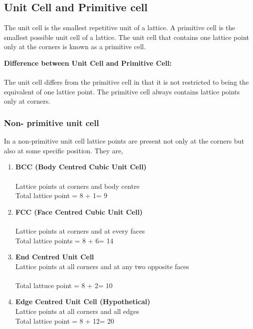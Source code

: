 \subsection{ Unit Cell and Primitive cell}
The unit cell is the smallest repetitive unit of a lattice. A primitive cell is the smallest possible unit cell of a lattice. The unit cell that contains one lattice point only at the corners is known as a primitive cell. 
\begin{note}
	\textbf{Difference between Unit Cell and Primitive Cell:}\\\\
	The unit cell differs from the primitive cell in that it is not restricted to being the equivalent of one lattice point. The primitive cell always contains lattice points only at corners.
\end{note}
\subsubsection{Non- primitive unit cell}
In a non-primitive unit cell lattice points are present not only at the corners but also at some specific position. They are,
\begin{enumerate}
	\item \textbf{BCC (Body Centred Cubic Unit Cell)}\\\\
	Lattice points at corners and body centre\\
	Total lattice point = 8 + 1= 9
	\item \textbf{FCC (Face Centred Cubic Unit Cell)}\\\\
	Lattice points at corners and at every faces\\
	Total lattice points = 8 + 6= 14
	\item \textbf{End Centred Unit Cell}\\
	Lattice points at all corners and at any two opposite faces\\\\
	Total lattuce point = 8 + 2= 10
	\item \textbf{Edge Centred Unit Cell (Hypothetical)}\\
	Lattice points at all corners and all edges\\
	Total lattice point = 8 + 12= 20
\end{enumerate}
